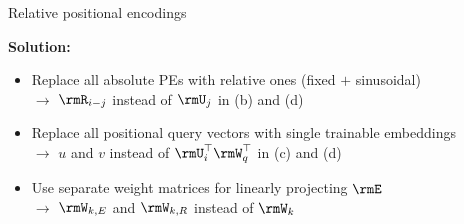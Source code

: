 \documentclass[11pt,compress,t,notes=noshow, xcolor=table]{beamer}
\begin{document}
\begin{vbframe}{Relative positional encodings}

\vfill

\textbf{Solution:}

\begin{itemize}
	\item Replace all absolute PEs with relative ones (fixed $+$ sinusoidal)\\
				$\to$ $\rmR_{i-j}$ instead of $\rmU_{j}$ in (b) and (d)
	\item Replace all positional query vectors with single trainable embeddings\\
				$\to$ $u$ and $v$ instead of $\rmU_{i}^\top \rmW_q^\top$ in (c) and (d)
	\item Use separate weight matrices for linearly projecting $\rmE$\\
				$\to$ $\rmW_{k,E}$ and $\rmW_{k,R}$ instead of $\rmW_{k}$
\end{itemize}

\vfill

\end{vbframe}


\endlecture
\end{document}
